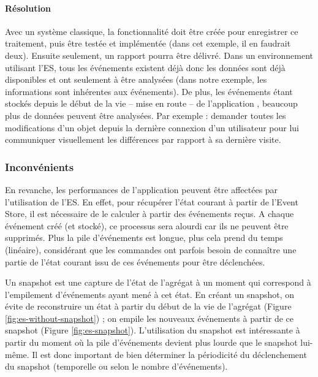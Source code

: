 \paragraph{Résolution} Avec un système classique, la fonctionnalité doit être 
créée pour enregistrer ce traitement, puis être testée et implémentée (dans cet 
exemple, il en faudrait deux). Ensuite seulement, un rapport pourra être délivré. 
Dans un environnement utilisant l'\gls{ES}, tous les événements existent déjà 
donc les données sont déjà disponibles et ont seulement à être analysées 
(dans notre exemple, les informations sont inhérentes aux événements). De plus, 
les événements étant stockés depuis le début de la vie -- mise en route -- de l'application , beaucoup plus de données peuvent être analysées. Par 
exemple : demander toutes les modifications d'un objet depuis la dernière 
connexion d'un utilisateur pour lui communiquer visuellement les différences par 
rapport à sa dernière visite.



\subsubsection{Inconvénients}
En revanche, les performances de l'application peuvent être affectées par 
l'utilisation de 
l'\gls{ES}. En effet, pour récupérer l'état courant à partir de l'Event Store, il est 
nécessaire de le calculer à partir des événements reçus.
A chaque événement créé (et stocké), ce processus sera alourdi car ils ne 
peuvent être supprimés. Plus la pile d'événements est longue, plus cela prend 
du temps (linéaire), considérant que les commandes ont parfois besoin de connaître une
partie de l'état courant issu de ces événements pour être déclenchées.
 
Un \gls{snapshot} est une capture de l'état de l'agrégat à un 
moment qui correspond à l'empilement d'événements ayant mené à cet état. En 
créant un \gls{snapshot}, on évite de reconstruire un état à partir du début de la 
vie de l'agrégat (Figure \ref{fig:es-without-snapshot}) ; on empile les nouveaux 
événements à partir de ce snapshot (Figure \ref{fig:es-snapshot}). 
L'utilisation du \gls{snapshot} est intéressante à partir du moment où la pile 
d'événements devient plus lourde que le \gls{snapshot} lui-même. Il est donc 
important de bien déterminer la périodicité du déclenchement du \gls{snapshot} 
(temporelle ou selon le nombre d'événements).

